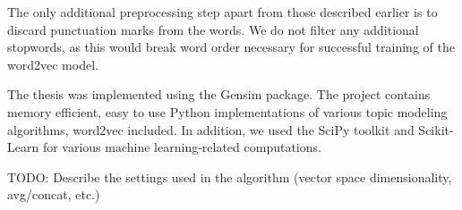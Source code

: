 The only additional preprocessing step apart from those described earlier is to discard punctuation marks from the words. We do not filter any additional stopwords, as this would break word order necessary for successful training of the word2vec model.

The thesis was implemented using the Gensim \cite{gensim} package. The project contains memory efficient, easy to use Python implementations of various topic modeling algorithms, word2vec included. In addition, we used the SciPy toolkit \cite{scipy} and Scikit-Learn \cite{scikit-learn} for various machine learning-related computations.

{\color{red} TODO: Describe the settings used in the algorithm (vector space dimensionality, avg/concat, etc.)}